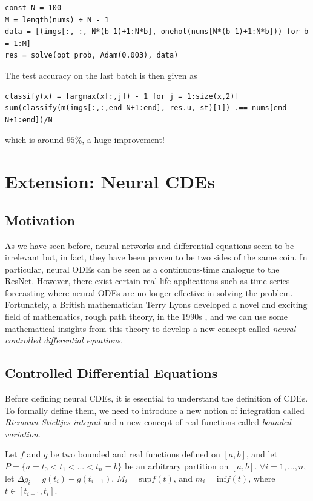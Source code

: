 \documentclass[a4paper,11pt,titlepage]{article}
\theoremstyle{definition}
\theoremstyle{plain}
\theoremstyle{remark}
\begin{document}
\begin{verbatim}
const N = 100
M = length(nums) ÷ N - 1
data = [(imgs[:, :, N*(b-1)+1:N*b], onehot(nums[N*(b-1)+1:N*b])) for b = 1:M]
res = solve(opt_prob, Adam(0.003), data)
\end{verbatim}

The test accuracy on the last batch is then given as

\begin{verbatim}
classify(x) = [argmax(x[:,j]) - 1 for j = 1:size(x,2)]
sum(classify(m(imgs[:,:,end-N+1:end], res.u, st)[1]) .== nums[end-N+1:end])/N
\end{verbatim}

which is around $95\%$, a huge improvement!

\pagebreak
\section{Extension: Neural CDEs}
\label{sec:extension}

\subsection{Motivation}

As we have seen before, neural networks and differential equations seem to be irrelevant but, in fact, they have been proven to be two sides of the same coin. In particular, neural ODEs can be seen as a continuous-time analogue to the ResNet. However, there exist certain real-life applications such as time series forecasting where neural ODEs are no longer effective in solving the problem. Fortunately, a British mathematician Terry Lyons developed a novel and exciting field of mathematics, rough path theory, in the 1990s \cite{kidger2022neural}, and we can use some mathematical insights from this theory to develop a new concept called \textit{neural controlled differential equations}.

\subsection{Controlled Differential Equations}

Before defining neural CDEs, it is essential to understand the definition of CDEs. To formally define them, we need to introduce a new notion of integration called \textit{Riemann-Stieltjes integral} and a new concept of real functions called \textit{bounded variation}.

Let $f$ and $g$ be two bounded and real functions defined on $[a,b]$, and let $P=\{a=t_0<t_1<...<t_n=b\}$ be an arbitrary partition on $[a,b]$. $\forall i = 1,...,n$, let $\Delta g_i = g(t_i) - g(t_{i-1})$, $M_i=\mathrm{sup}f(t)$, and $m_i=\mathrm{inf}f(t)$, where $t\in[t_{i-1},t_i]$.
\end{document}

